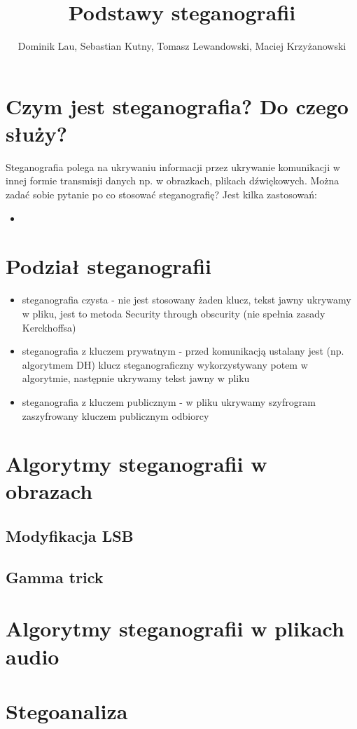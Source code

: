 \documentclass{article}
\title{Podstawy steganografii}
\author{Dominik Lau, Sebastian Kutny, Tomasz Lewandowski, Maciej Krzyżanowski}
\begin{document}
\maketitle
\section{Czym jest steganografia? Do czego służy?}
Steganografia polega na ukrywaniu informacji przez ukrywanie komunikacji w innej formie transmisji danych
np. w obrazkach,  plikach dźwiękowych.  Można zadać sobie pytanie po co stosować steganografię? Jest kilka 
zastosowań:
\begin{itemize}
	\item 
\end{itemize}
\section{Podział steganografii}
\begin{itemize}
	\item steganografia czysta - nie jest stosowany żaden klucz, tekst jawny ukrywamy w pliku, jest to metoda 	Security through obscurity (nie spełnia zasady Kerckhoffsa)
	\item steganografia z kluczem prywatnym - przed komunikacją ustalany jest (np. algorytmem DH) klucz
	steganograficzny wykorzystywany potem w algorytmie, następnie ukrywamy tekst jawny w pliku
	\item steganografia z kluczem publicznym - w pliku ukrywamy szyfrogram zaszyfrowany kluczem publicznym
	odbiorcy
\end{itemize}
\section{Algorytmy steganografii w obrazach}
\subsection{Modyfikacja LSB}
\subsection{Gamma trick}
\section{Algorytmy steganografii w plikach audio}
\section{Stegoanaliza}
\end{document}
